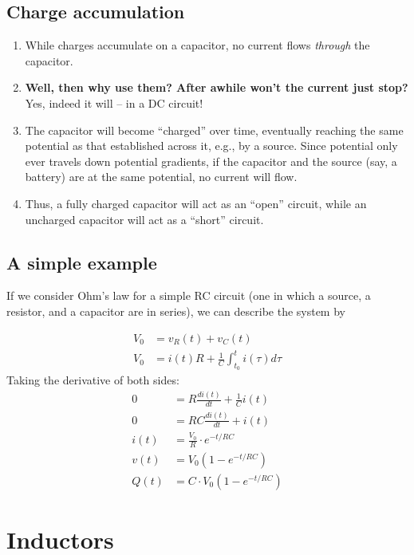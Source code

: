 \documentclass[11pt]{book}
\begin{document}
\subsection{Charge accumulation}
\begin{enumerate}
	\item While charges accumulate on a capacitor, no current flows \textit{through} the capacitor.
	\item \textbf{Well, then why use them? After awhile won't the current just stop?} Yes, indeed it will -- in a DC circuit!
	\item The capacitor will become ``charged'' over time, eventually reaching the same potential as that established across it, e.g., by a source. Since potential only ever travels down potential gradients, if the capacitor and the source (say, a battery) are at the same potential, no current will flow.
	\item Thus, a fully charged capacitor will act as an ``open'' circuit, while an uncharged capacitor will act as a ``short'' circuit.
\end{enumerate}

\subsection{A simple example}
If we consider Ohm's law for a simple RC circuit (one in which a source, a resistor, and a capacitor are in series), we can describe the system by

\begin{align}
	V_0 &= v_{R}(t) + v_{C}(t) \\
	V_0 &= i(t)R + \frac{1}{C}\int_{t_0}^t i(\tau)d\tau
\end{align}
Taking the derivative of both sides:
\begin{align}
	0 &= R\frac{di(t)}{dt} + \frac{1}{C}i(t) \\
	0 &= RC\frac{di(t)}{dt} + i(t) \\
	i(t) &= \frac{V_0}{R}\cdot e^{-t/RC} \\
	v(t) &= V_0\left(1 - e^{-t/RC}\right) \\
	Q(t) &= C\cdot V_0\left(1 - e^{-t/RC}\right)
\end{align}


\section{Inductors}
\end{document}

